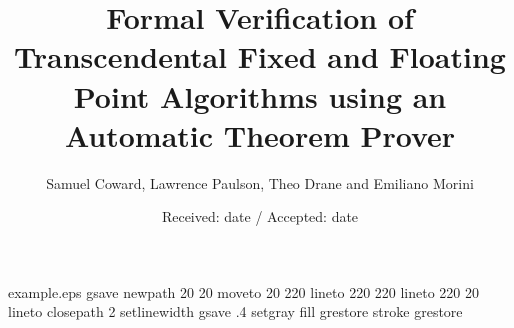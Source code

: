 \begin{filecontents*}{example.eps}
gsave
newpath
  20 20 moveto
  20 220 lineto
  220 220 lineto
  220 20 lineto
closepath
2 setlinewidth
gsave
  .4 setgray fill
grestore
stroke
grestore
\end{filecontents*}

\RequirePackage{fix-cm}

\documentclass[smallcondensed]{svjour3}     
\smartqed  
%
\usepackage{graphicx}
%
\usepackage{mathptmx}      %
%
\usepackage[utf8]{inputenc}
\usepackage{bm}
\usepackage{amssymb,amsmath}
\usepackage{topcapt,booktabs}
\usepackage{tikz}
\usepackage{pgfplots} 
\pgfplotsset{compat=newest}

\usetikzlibrary{positioning}

\newcommand{\abs}[1]{\lvert#1\rvert}
\newcommand{\floor}{\mathop{\textrm{floor}}\nolimits}
	



\title{Formal Verification of Transcendental Fixed and Floating Point Algorithms using an Automatic Theorem Prover
}
\author{Samuel Coward, Lawrence Paulson, Theo Drane and Emiliano Morini
}
\date{Received: date / Accepted: date}


\maketitle

